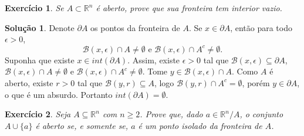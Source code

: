 \documentclass[a4paper,12pt]{article}
\newcommand{\R}{\mathbb{R}}
\newcommand{\B}{\mathcal{B}}
\theoremstyle{exer}
\newtheorem{exercise}{Exercício}
\theoremstyle{definition}
\newtheorem{solution}{Solução}
\theoremstyle{plain}
\begin{document}
\begin{exercise}
    Se $A \subset \R^n$ é aberto, prove que sua fronteira tem interior vazio.
\end{exercise}

\begin{solution}
    Denote $\partial A$ os pontos da fronteira de $A$. Se $x \in \partial A$,
    então para todo $\epsilon > 0$,
    $$
    \B(x,\epsilon) \cap A \neq \emptyset \text{ e } \B(x,\epsilon) \cap A^c \neq \emptyset .
    $$
    Suponha que existe $x \in int(\partial A)$. Assim, existe $\epsilon > 0$
    tal que $\B(x, \epsilon) \subseteq \partial A$,     $\B(x,\epsilon)
    \cap A \neq \emptyset$ e $\B(x,\epsilon)
    \cap A^c \neq \emptyset$. Tome $y \in \B(x, \epsilon) \cap A$. Como $A$ é
    aberto, existe $r > 0$ tal que $\B(y,r) \subseteq A$, logo $\B(y, r) \cap A^c = \emptyset$,  porém $y \in
    \partial A$, o que é um absurdo. Portanto $int(\partial A) = \emptyset$. 
\end{solution}

\begin{exercise}
    Seja $A \subseteq \R^n$ com $n \ge 2$. Prove que, dado $a \in \R^n/A$, o
    conjunto $A \cup \{a\}$ é aberto se, e somente se, $a$ é um ponto isolado da
    fronteira de $A$. 
\end{exercise}
\end{document}
